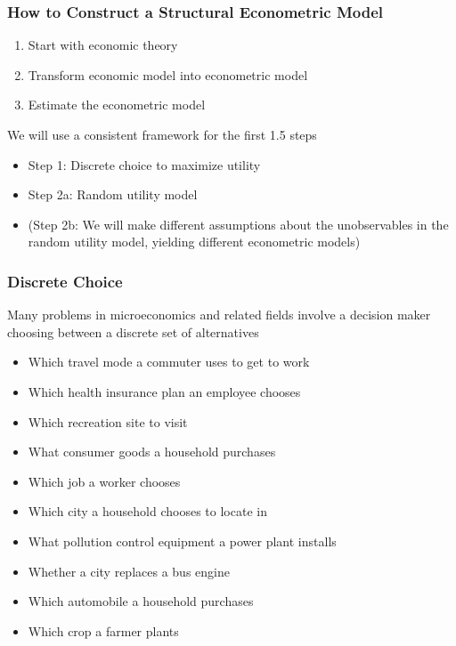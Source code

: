 \documentclass{beamer}\usepackage[]{graphicx}\usepackage[]{xcolor}
\begin{document}
\begin{frame}\frametitle{How to Construct a Structural Econometric Model}
	\begin{enumerate}
		\item Start with economic theory
		\item Transform economic model into econometric model
		\item Estimate the econometric model
	\end{enumerate}
	\vspace{3ex}
	We will use a consistent framework for the first 1.5 steps
	\begin{itemize}
		\item Step 1: Discrete choice to maximize utility
		\item Step 2a: Random utility model
		\item (Step 2b: We will make different assumptions about the unobservables in the random utility model, yielding different econometric models)
	\end{itemize}
\end{frame}

\begin{frame}\frametitle{Discrete Choice}
    Many problems in microeconomics and related fields involve a decision maker choosing between a discrete set of alternatives
    \begin{itemize}	
    	\item Which travel mode a commuter uses to get to work
    	\item Which health insurance plan an employee chooses
    	\item Which recreation site to visit
    	\item What consumer goods a household purchases
    	\item Which job a worker chooses
    	\item Which city a household chooses to locate in
    	\item What pollution control equipment a power plant installs
    	\item Whether a city replaces a bus engine
    	\item Which automobile a household purchases
    	\item Which crop a farmer plants
    \end{itemize}
\end{frame}
\end{document}
